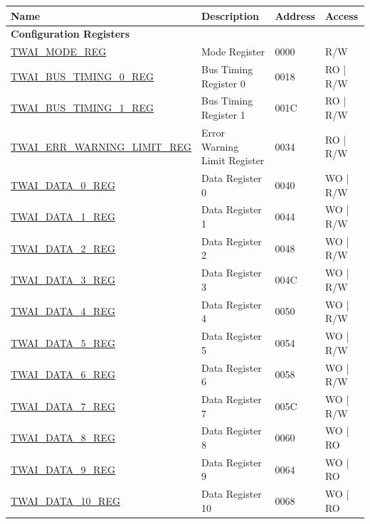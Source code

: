 \begin{longtable}{ | p{6cm} | p{6cm} | p{1.2cm} | p{2cm} | }
\hline\rowcolor{lightgray}
Name & Description &  Address & Access \\ \hline
\endhead
\multicolumn{4}{|l|}{\textbf{Configuration Registers}} \\ \hline
\hyperref[regdesc:TWAIMODEREG]{TWAI\_MODE\_REG} & Mode Register & \hexprefix{}0000 & R/W \\ \hline
\hyperref[regdesc:TWAIBUSTIMING0REG]{TWAI\_BUS\_TIMING\_0\_REG} & Bus Timing Register 0 & \hexprefix{}0018 & RO | R/W \\ \hline
\hyperref[regdesc:TWAIBUSTIMING1REG]{TWAI\_BUS\_TIMING\_1\_REG} & Bus Timing Register 1 & \hexprefix{}001C & RO | R/W \\ \hline
\hyperref[regdesc:TWAIERRWARNINGLIMITREG]{TWAI\_ERR\_WARNING\_LIMIT\_REG} & Error Warning Limit Register & \hexprefix{}0034 & RO | R/W \\ \hline
\hyperref[regdesc:TWAIDATA0REG]{TWAI\_DATA\_0\_REG} & Data Register 0 & \hexprefix{}0040 & WO | R/W \\ \hline
\hyperref[regdesc:TWAIDATA1REG]{TWAI\_DATA\_1\_REG} & Data Register 1 & \hexprefix{}0044 & WO | R/W \\ \hline
\hyperref[regdesc:TWAIDATA2REG]{TWAI\_DATA\_2\_REG} & Data Register 2 & \hexprefix{}0048 & WO | R/W \\ \hline
\hyperref[regdesc:TWAIDATA3REG]{TWAI\_DATA\_3\_REG} & Data Register 3 & \hexprefix{}004C & WO | R/W \\ \hline
\hyperref[regdesc:TWAIDATA4REG]{TWAI\_DATA\_4\_REG} & Data Register 4 & \hexprefix{}0050 & WO | R/W \\ \hline
\hyperref[regdesc:TWAIDATA5REG]{TWAI\_DATA\_5\_REG} & Data Register 5 & \hexprefix{}0054 & WO | R/W \\ \hline
\hyperref[regdesc:TWAIDATA6REG]{TWAI\_DATA\_6\_REG} & Data Register 6 & \hexprefix{}0058 & WO | R/W \\ \hline
\hyperref[regdesc:TWAIDATA7REG]{TWAI\_DATA\_7\_REG} & Data Register 7 & \hexprefix{}005C & WO | R/W \\ \hline
\hyperref[regdesc:TWAIDATA8REG]{TWAI\_DATA\_8\_REG} & Data Register 8 & \hexprefix{}0060 & WO | RO \\ \hline
\hyperref[regdesc:TWAIDATA9REG]{TWAI\_DATA\_9\_REG} & Data Register 9 & \hexprefix{}0064 & WO | RO \\ \hline
\hyperref[regdesc:TWAIDATA10REG]{TWAI\_DATA\_10\_REG} & Data Register 10 & \hexprefix{}0068 & WO | RO \\ \hline

\end{longtable}

